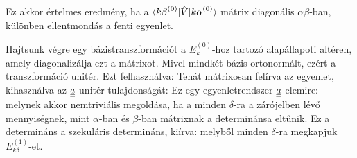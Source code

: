     Ez akkor értelmes eredmény, ha a $\langle{k\beta}^{(0)}\rvert\hat{V}\lvert{k\alpha}^{(0)}\rangle$ mátrix diagonális $\alpha\beta$-ban, különben ellentmondás a fenti egyenlet.
    
    Hajtsunk végre egy bázistranszformációt a $E_k^{(0)}$-hoz tartozó alapállapoti altéren, amely diagonalizálja ezt a mátrixot. 
    Mivel mindkét bázis ortonormált, ezért a transzformáció unitér. Ezt felhasználva:
    Tehát mátrixosan felírva az egyenlet, kihasználva az $\underline{\underline{a}}$ unitér tulajdonságát:
    Ez egy egyenletrendszer $\underline{\underline{a}}$ elemire:
    melynek akkor nemtriviális megoldása, ha a minden $\delta$-ra a zárójelben lévő mennyiségnek, mint $\alpha$-ban és $\beta$-ban mátrixnak a determinánsa eltűnik. Ez a determináns a szekuláris determináns, kiírva:
    melyből minden $\delta$-ra megkapjuk $E_{k\delta}^{(1)}$-et.
    
